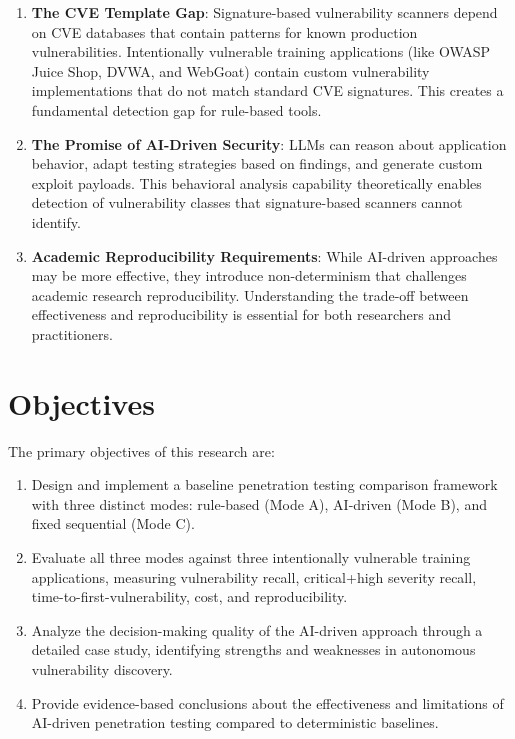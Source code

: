 \documentclass[12pt,a4paper,oneside]{book}
\begin{document}
\begin{enumerate}
    \item \textbf{The CVE Template Gap}: Signature-based vulnerability scanners depend on CVE databases that contain patterns for known production vulnerabilities. Intentionally vulnerable training applications (like OWASP Juice Shop, DVWA, and WebGoat) contain custom vulnerability implementations that do not match standard CVE signatures. This creates a fundamental detection gap for rule-based tools.
    
    \item \textbf{The Promise of AI-Driven Security}: LLMs can reason about application behavior, adapt testing strategies based on findings, and generate custom exploit payloads. This behavioral analysis capability theoretically enables detection of vulnerability classes that signature-based scanners cannot identify.
    
    \item \textbf{Academic Reproducibility Requirements}: While AI-driven approaches may be more effective, they introduce non-determinism that challenges academic research reproducibility. Understanding the trade-off between effectiveness and reproducibility is essential for both researchers and practitioners.
\end{enumerate}

\section{Objectives}

The primary objectives of this research are:

\begin{enumerate}
    \item Design and implement a baseline penetration testing comparison framework with three distinct modes: rule-based (Mode A), AI-driven (Mode B), and fixed sequential (Mode C).
    
    \item Evaluate all three modes against three intentionally vulnerable training applications, measuring vulnerability recall, critical+high severity recall, time-to-first-vulnerability, cost, and reproducibility.
    
    \item Analyze the decision-making quality of the AI-driven approach through a detailed case study, identifying strengths and weaknesses in autonomous vulnerability discovery.
    
    \item Provide evidence-based conclusions about the effectiveness and limitations of AI-driven penetration testing compared to deterministic baselines.
\end{enumerate}
\end{document}
